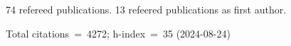 74 refereed publications. 13 refeered publications as first author.

Total citations~=~4272; h-index~=~35 (2024-08-24)